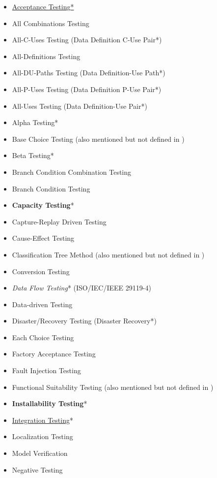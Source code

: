 \begin{itemize}
      \item \underline{Acceptance Testing*}
      \item All Combinations Testing
      \item All-C-Uses Testing (Data Definition C-Use Pair*)
      \item All-Definitions Testing
      \item All-DU-Paths Testing (Data Definition-Use Path*)
      \item All-P-Uses Testing (Data Definition P-Use Pair*)
      \item All-Uses Testing (Data Definition-Use Pair*)
      \item Alpha Testing*
      \item Base Choice Testing (also mentioned but not defined in
            \citep{IEEE2017})
      \item Beta Testing*
      \item Branch Condition Combination Testing
      \item Branch Condition Testing
      \item \textbf{Capacity Testing}*
      \item Capture-Replay Driven Testing
      \item Cause-Effect Testing
      \item Classification Tree Method (also mentioned but not defined in
            \citep{IEEE2013})
      \item Conversion Testing
      \item \emph{Data Flow Testing}* (ISO/IEC/IEEE 29119-4)
      \item Data-driven Testing
      \item Disaster/Recovery Testing (Disaster Recovery*)
      \item Each Choice Testing
      \item Factory Acceptance Testing
      \item Fault Injection Testing
      \item Functional Suitability Testing (also mentioned but not defined in
            \citep{IEEE2017})
      \item \textbf{Installability Testing}*
      \item \underline{Integration Testing}*
      \item Localization Testing
      \item Model Verification
      \item Negative Testing

\end{itemize}
